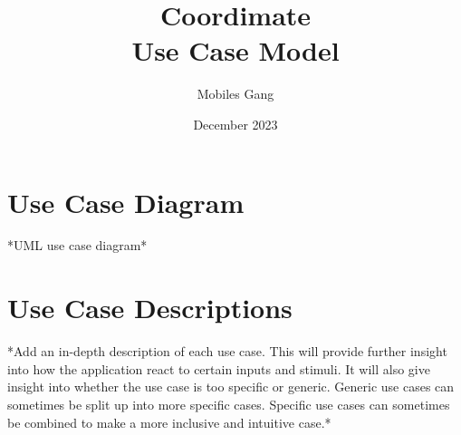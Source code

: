 \documentclass{article}
\title{Coordimate\\Use Case Model}
\date{December 2023}
\author{Mobiles Gang}
\begin{document}
\maketitle

\section{Use Case Diagram} *UML use case diagram* 

\section{Use Case Descriptions} *Add an in-depth description of each use case.
This will provide further insight into how the application react to certain
inputs and stimuli. It will also give insight into whether the use case is too
specific or generic. Generic use cases can sometimes be split up into more
specific cases. Specific use cases can sometimes be combined to make a more
inclusive and intuitive case.*
\end{document}
